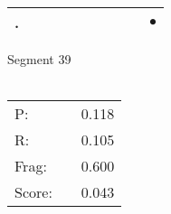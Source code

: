 \documentclass[landscape]{article}
\newcommand{\ssp}{\hspace{2pt}}
\newcommand{\mex}{\cellcolor{g}$\bullet$}
\begin{document}
\begin{tabular}{|l|p{10pt}|p{10pt}|p{10pt}|p{10pt}|p{10pt}|p{10pt}|p{10pt}|p{10pt}|p{10pt}|}
\hline
\ssp \cellcolor{ref8}. \ssp&\hspace{2pt}&\hspace{2pt}&\hspace{2pt}&\hspace{2pt}&\hspace{2pt}&\hspace{2pt}&\hspace{2pt}&\hspace{2pt}&\hspace{2pt}\mex\\
\hline
\end{tabular}

\vspace{6pt}
\noindent Segment 39\\\\
\noindent\begin{tabular}{lm{12pt}r}
\hline
P:&&0.118\\
R:&&0.105\\
Frag:&&0.600\\
Score:&&0.043\\
\end{tabular}

\newpage
\end{document}
